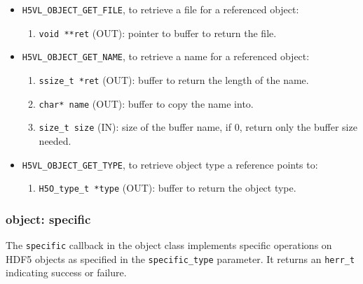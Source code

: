 \begin{itemize}
\item \texttt{H5VL\_OBJECT\_GET\_FILE}, to retrieve a file for a referenced object:
  \begin{enumerate}
  \item \texttt{void **ret} (OUT): pointer to buffer to return the file.
  \end{enumerate}

 \item \texttt{H5VL\_OBJECT\_GET\_NAME}, to retrieve a name for a referenced object:
  \begin{enumerate}
  \item \texttt{ssize\_t *ret} (OUT): buffer to return the length of the
    name.
  \item \texttt{char* name} (OUT): buffer to copy the name into.
  \item \texttt{size\_t size} (IN): size of the buffer name, if 0, return
    only the buffer size needed.
  \end{enumerate}
  
\item \texttt{H5VL\_OBJECT\_GET\_TYPE}, to retrieve object type a reference
  points to:
  \begin{enumerate}
  \item \texttt{H5O\_type\_t *type} (OUT): buffer to return the object type.
  \end{enumerate}
\end{itemize}

\subsubsection{object: specific}
The \texttt{specific} callback in the object class implements specific operations on HDF5 objects as specified in the \texttt{specific\_type} parameter. It returns an \texttt{herr\_t} indicating success or failure.\bigskip

